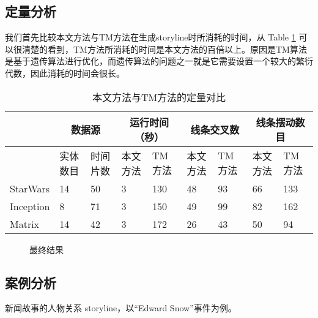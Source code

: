 \subsection{定量分析}
我们首先比较本文方法与TM方法在生成storyline时所消耗的时间，从 Table \ref{table:quantitative-analysis} 可以很清楚的看到，TM方法所消耗的时间是本文方法的百倍以上。原因是TM算法是基于遗传算法进行优化，而遗传算法的问题之一就是它需要设置一个较大的繁衍代数，因此消耗的时间会很长。
\begin{table}[htb]
\caption{本文方法与TM方法的定量对比}
\label{table:quantitative-analysis}
\begin{center}
  \begin{tabular}{|*{9}{l |}}\hline
                    & \multicolumn{2}{c|}{数据源} & \multicolumn{2}{c|}{运行时间（秒）} & \multicolumn{2}{c|}{线条交叉数} & \multicolumn{2}{c|}{线条摆动数目} \\ \hline
                    & 实体数目 &  时间片数 & 本文方法 & TM 方法 & 本文方法 & TM 方法 & 本文方法 & TM 方法 \\ \hline
    StarWars & 14           & 50             & 3              & 130       &  48          &  93         &  66           & 133        \\ \hline
    Inception &  8            & 71             & 3              & 150       &  49          &  99         &  82           & 162        \\ \hline
    Matrix      & 14           & 42             & 3              & 172       &  26          &  43         &  50           & 94          \\ \hline
  \end{tabular}
\end{center}
\end{table}

\begin{figure}[htb]
	\centering
	\caption{最终结果}
	\label{fig:layout-sample}
\end{figure}

\subsection{案例分析}
新闻故事的人物关系 storyline，以“Edward Snow”事件为例。

